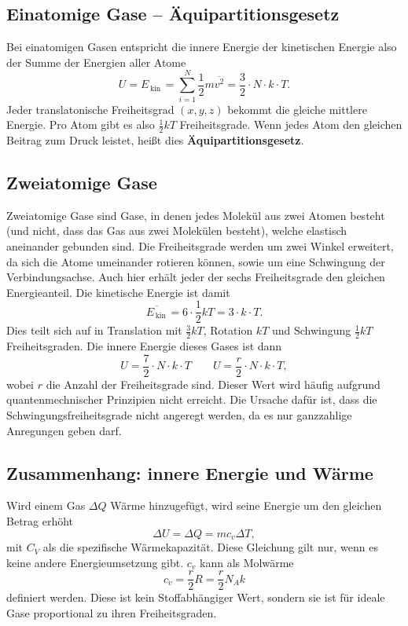 \documentclass[a4paper,12pt]{article}
\begin{document}
\subsection{Einatomige Gase -- Äquipartitionsgesetz}
Bei einatomigen Gasen entspricht die innere Energie der kinetischen Energie also der Summe der Energien aller Atome
\[ 
        U=E_{\,\text{kin}\,}=\sum_{i=1}^{N}\dfrac{1}{2}m\overline{v^2}=\dfrac{3}{2}\cdot N\cdot k\cdot T
.\] 
Jeder translatonische Freiheitsgrad $\left(x,y,z\right)$ bekommt die gleiche mittlere Energie. Pro Atom gibt es also $\tfrac{1}{2}kT$ Freiheitsgrade. Wenn jedes Atom den gleichen Beitrag zum Druck leistet, heißt dies \textbf{Äquipartitionsgesetz}.

\subsection{Zweiatomige Gase}
Zweiatomige Gase sind Gase, in denen jedes Molekül aus zwei Atomen besteht (und nicht, dass das Gas aus zwei Molekülen besteht), welche elastisch aneinander gebunden sind. Die Freiheitsgrade werden um zwei Winkel erweitert, da sich die Atome umeinander rotieren können, sowie um eine Schwingung der Verbindungsachse. Auch hier erhält jeder der sechs Freiheitsgrade den gleichen Energieanteil. Die kinetische Energie ist damit
\[ 
        \overline{E_{\,\text{kin}\,}}=6\cdot \dfrac{1}{2}kT=3\cdot k\cdot T
.\] 
Dies teilt sich auf in Translation mit $\tfrac{3}{2}kT$, Rotation $kT$ und Schwingung $\tfrac{1}{2}kT$ Freiheitsgraden. Die innere Energie dieses Gases ist dann
\[ 
        U=\dfrac{7}{2}\cdot N\cdot k\cdot T\qquad U=\dfrac{r}{2}\cdot N\cdot k\cdot T
,\] 
wobei $r$ die Anzahl der Freiheitsgrade sind. Dieser Wert wird häufig aufgrund quantenmechnischer Prinzipien nicht erreicht. Die Ursache dafür ist, dass die Schwingungsfreiheitsgrade nicht angeregt werden, da es nur ganzzahlige Anregungen geben darf.

\subsection{Zusammenhang: innere Energie und Wärme}
Wird einem Gas $\Delta Q$ Wärme hinzugefügt, wird seine Energie um den gleichen Betrag erhöht
\[ 
        \Delta U=\Delta Q=mc_v\Delta T
,\] 
mit $C_V$ als die spezifische Wärmekapazität. Diese Gleichung gilt nur, wenn es keine andere Energieumsetzung gibt. $c_v$ kann als Molwärme 
\[ 
        c_v=\dfrac{r}{2}R=\dfrac{r}{2}N_Ak
\] 
definiert werden. Diese ist kein Stoffabhängiger Wert, sondern sie ist für ideale Gase proportional zu ihren Freiheitsgraden.
\end{document}
